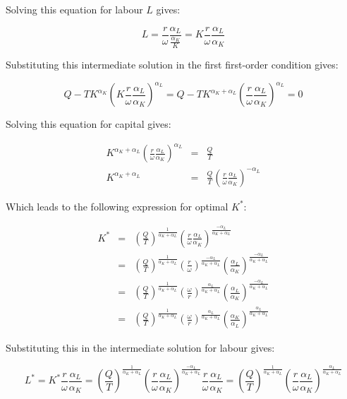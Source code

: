 \documentclass[
]{book}
\begin{document}
Solving this equation for labour \(L\) gives:

\begin{equation}
L = \frac{r}{\omega} \frac{\alpha_L}{\frac{\alpha_K}{K}} = K \frac{r}{\omega} \frac{\alpha_L}{\alpha_K} 
\end{equation}

Substituting this intermediate solution in the first first-order condition gives:

\begin{equation}
Q - T K^{\alpha_K} \left(K\frac{r}{\omega}\frac{\alpha_L}{\alpha_K}\right)^{\alpha_L} = Q - T K^{\alpha_K + \alpha_L} \left(\frac{r}{\omega}\frac{\alpha_L}{\alpha_K}\right)^{\alpha_L} =0
\end{equation}

Solving this equation for capital gives:

\begin{eqnarray}
K^{\alpha_K + \alpha_L} \left(\frac{r}{\omega}\frac{\alpha_L}{\alpha_K}\right)^{\alpha_L} &=& \frac{Q}{T} \\
K^{\alpha_K + \alpha_L}  &=& \frac{Q}{T} \left(\frac{r}{\omega}\frac{\alpha_L}{\alpha_K}\right)^{-\alpha_L} 
\end{eqnarray}

Which leads to the following expression for optimal \(K^*\):

\begin{eqnarray}
K^* &=& \left(\frac{Q}{T}\right)^{\frac{1}{\alpha_K + \alpha_L}} \left(\frac{r}{\omega}\frac{\alpha_L}{\alpha_K}\right)^{\frac{-\alpha_L}{\alpha_K + \alpha_L}} \\
&=&\left(\frac{Q}{T}\right)^{\frac{1}{\alpha_K + \alpha_L}} \left(\frac{r}{\omega}\right)^{\frac{-\alpha_L}{\alpha_K + \alpha_L}} \left(\frac{\alpha_L}{\alpha_K}\right)^{\frac{-\alpha_L}{\alpha_K + \alpha_L}} \\
&=&\left(\frac{Q}{T}\right)^{\frac{1}{\alpha_K + \alpha_L}} \left(\frac{\omega}{r}\right)^{\frac{\alpha_L}{\alpha_K + \alpha_L}} \left(\frac{\alpha_L}{\alpha_K}\right)^{\frac{-\alpha_L}{\alpha_K + \alpha_L}} \\
&=&\left(\frac{Q}{T}\right)^{\frac{1}{\alpha_K + \alpha_L}} \left(\frac{\omega}{r}\right)^{\frac{\alpha_L}{\alpha_K + \alpha_L}} \left(\frac{\alpha_K}{\alpha_L}\right)^{\frac{\alpha_L}{\alpha_K + \alpha_L}} 
\end{eqnarray}

Substituting this in the intermediate solution for labour gives:

\begin{equation}
L^* = K^* \frac{r}{\omega} \frac{\alpha_L}{\alpha_K} = \left(\frac{Q}{T}\right)^{\frac{1}{\alpha_K + \alpha_L}} \left(\frac{r}{\omega}\frac{\alpha_L}{\alpha_K}\right)^{\frac{-\alpha_L}{\alpha_K + \alpha_L}}\frac{r}{\omega} \frac{\alpha_L}{\alpha_K} = \left(\frac{Q}{T}\right)^{\frac{1}{\alpha_K + \alpha_L}} \left(\frac{r}{\omega}\frac{\alpha_L}{\alpha_K}\right)^{\frac{\alpha_L}{\alpha_K + \alpha_L}}
\end{equation}
\end{document}
